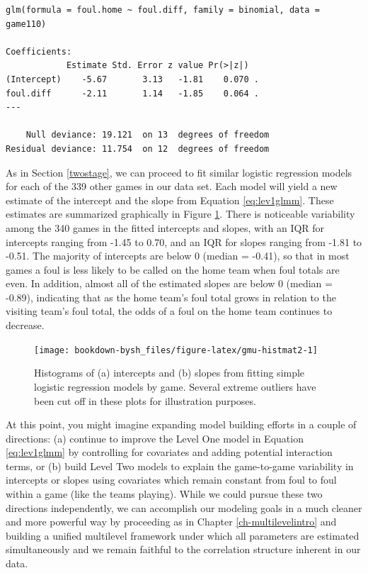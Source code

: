 \documentclass[
]{krantz}
\begin{document}
\begin{verbatim}
glm(formula = foul.home ~ foul.diff, family = binomial, data = game110)

Coefficients:
            Estimate Std. Error z value Pr(>|z|)  
(Intercept)    -5.67       3.13   -1.81    0.070 .
foul.diff      -2.11       1.14   -1.85    0.064 .
---

    Null deviance: 19.121  on 13  degrees of freedom
Residual deviance: 11.754  on 12  degrees of freedom
\end{verbatim}

As in Section \ref{twostage}, we can proceed to fit similar logistic regression models for each of the 339 other games in our data set. Each model will yield a new estimate of the intercept and the slope from Equation \eqref{eq:lev1glmm}. These estimates are summarized graphically in Figure \ref{fig:gmu-histmat2}. There is noticeable variability among the 340 games in the fitted intercepts and slopes, with an IQR for intercepts ranging from -1.45 to 0.70, and an IQR for slopes ranging from -1.81 to -0.51. The majority of intercepts are below 0 (median = -0.41), so that in most games a foul is less likely to be called on the home team when foul totals are even. In addition, almost all of the estimated slopes are below 0 (median = -0.89), indicating that as the home team's foul total grows in relation to the visiting team's foul total, the odds of a foul on the home team continues to decrease.

\begin{figure}

{\centering \texttt{[image: bookdown-bysh\_files/figure-latex/gmu-histmat2-1]} 

}

\caption{Histograms of (a) intercepts and (b) slopes from fitting simple logistic regression models by game.  Several extreme outliers have been cut off in these plots for illustration purposes.}\label{fig:gmu-histmat2}
\end{figure}

At this point, you might imagine expanding model building efforts in a couple of directions: (a) continue to improve the Level One model in Equation \eqref{eq:lev1glmm} by controlling for covariates and adding potential interaction terms, or (b) build Level Two models to explain the game-to-game variability in intercepts or slopes using covariates which remain constant from foul to foul within a game (like the teams playing). While we could pursue these two directions independently, we can accomplish our modeling goals in a much cleaner and more powerful way by proceeding as in Chapter \ref{ch-multilevelintro} and building a unified multilevel framework under which all parameters are estimated simultaneously and we remain faithful to the correlation structure inherent in our data.
\end{document}
